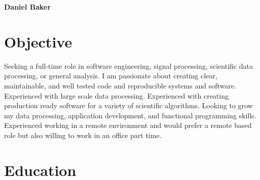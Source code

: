 



\textbf{\Huge Daniel Baker}
\begin{profile}
\end{profile}

\section{Objective}

\begin{blockquote}
    Seeking a full-time role in software engineering, signal processing, scientific data processing, or general analysis.
    I am passionate about creating clear, maintainable, and well tested code and reproducible systems and software.
    Experienced with large scale data processing.
    Experienced with creating production ready software for a variety of scientific algorithms.
    Looking to grow my data processing, application development, and functional programming skills.
    Experienced working in a remote environment and would prefer a remote based role but also willing to work in an office part time.
\end{blockquote}

\section{Education}

\begin{education}

    \begin{education}
    \end{education}

    \begin{education}
    \end{education}

    \begin{education}
    \end{education}

\end{education}


